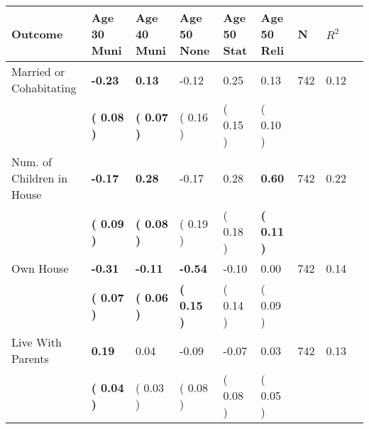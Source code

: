 \begin{tabular}{L{6.2cm} C{1.8cm} C{1.8cm} C{1.8cm} C{1.8cm} C{1.8cm} C{1.8cm} C{0.3cm} C{0.3cm}}
\toprule
 \textbf{Outcome} & \textbf{Age 30 Muni} & \textbf{Age 40 Muni} & \textbf{Age 50 None} & \textbf{Age 50 Stat} & \textbf{Age 50 Reli} & \textbf{N} & \textbf{$ R^2$} \\
\midrule
Married or Cohabitating & \textbf{    -0.23} & \textbf{     0.13} &     -0.12 &      0.25 &      0.13  & 742 &       0.12 \\ 
 & \textbf{(     0.08 )} & \textbf{(     0.07 )} & (     0.16 ) & (     0.15 ) & (     0.10 )  & \\
Num. of Children in House & \textbf{    -0.17} & \textbf{     0.28} &     -0.17 &      0.28 & \textbf{     0.60}  & 742 &       0.22 \\ 
 & \textbf{(     0.09 )} & \textbf{(     0.08 )} & (     0.19 ) & (     0.18 ) & \textbf{(     0.11 )}  & \\
Own House & \textbf{    -0.31} & \textbf{    -0.11} & \textbf{    -0.54} &     -0.10 &      0.00  & 742 &       0.14 \\ 
 & \textbf{(     0.07 )} & \textbf{(     0.06 )} & \textbf{(     0.15 )} & (     0.14 ) & (     0.09 )  & \\
Live With Parents & \textbf{     0.19} &      0.04 &     -0.09 &     -0.07 &      0.03  & 742 &       0.13 \\ 
 & \textbf{(     0.04 )} & (     0.03 ) & (     0.08 ) & (     0.08 ) & (     0.05 )  & \\
\bottomrule
\end{tabular}
